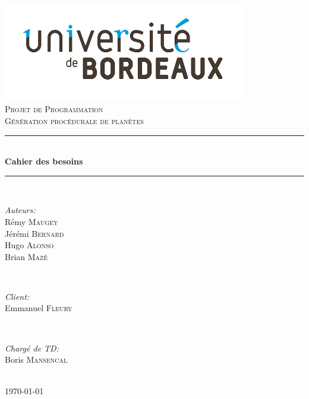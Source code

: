 \documentclass[12pt]{report}
\begin{document}

\begin{titlepage}

\newcommand{\HRule}{\rule{\linewidth}{0.7mm}} %

\center
 
\includegraphics[width=0.8\textwidth]{img/logo.jpg}\\

\textsc{\Large Projet de Programmation}\\[0.5cm]
\textsc{\large Génération procédurale de planètes}\\[0.5cm]


\HRule \\[0.4cm]
{ \huge \bfseries Cahier des besoins}\\[0.4cm]
\HRule \\[1.5cm]
 

\begin{minipage}{0.4\textwidth}
\begin{flushleft} \large
\emph{Auteurs:}\\
Rémy \textsc{Maugey}\\
Jérémi \textsc{Bernard}\\
Hugo \textsc{Alonso}\\
Brian \textsc{Mazé}\\
\end{flushleft}
\end{minipage}
~
\begin{minipage}{0.4\textwidth}
\begin{flushright} \large
\emph{Client:} \\
Emmanuel \textsc{Fleury}
\end{flushright}
~
\begin{flushright} \large
\emph{Chargé de TD:} \\
Boris \textsc{Mansencal}
\end{flushright}
\end{minipage}\\[2cm]


{\large \today}\\[2cm] 


\vfill %

\end{titlepage}
\end{document}
